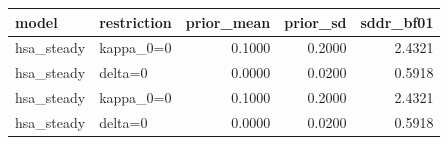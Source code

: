 \begin{tabular}{llrrr}
\toprule
model & restriction & prior\_mean & prior\_sd & sddr\_bf01 \\
\midrule
hsa\_steady & kappa\_0=0 & 0.1000 & 0.2000 & 2.4321 \\
hsa\_steady & delta=0 & 0.0000 & 0.0200 & 0.5918 \\
hsa\_steady & kappa\_0=0 & 0.1000 & 0.2000 & 2.4321 \\
hsa\_steady & delta=0 & 0.0000 & 0.0200 & 0.5918 \\
\bottomrule
\end{tabular}
